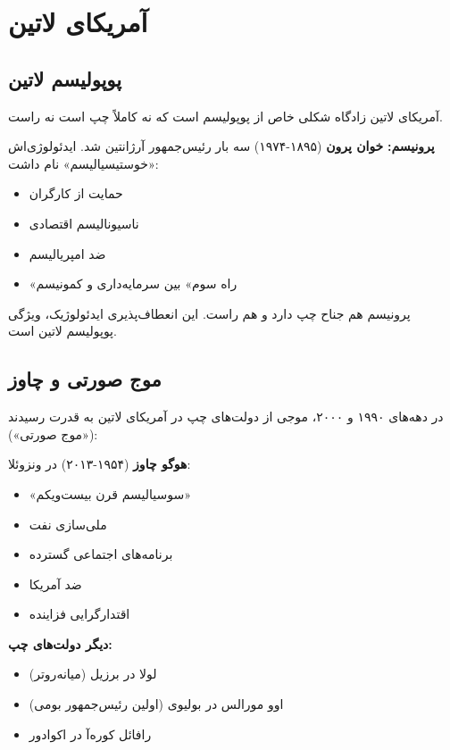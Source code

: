 \section{آمریکای لاتین}

\subsection{پوپولیسم لاتین}


آمریکای لاتین زادگاه شکلی خاص از پوپولیسم است که نه کاملاً چپ است نه راست.

\textbf{پرونیسم:}
\textbf{خوان پرون} (۱۸۹۵-۱۹۷۴) سه بار رئیس‌جمهور آرژانتین شد. ایدئولوژی‌اش «خوستیسیالیسم» نام داشت:
\begin{itemize}
    \item حمایت از کارگران
    \item ناسیونالیسم اقتصادی
    \item ضد امپریالیسم
    \item «راه سوم» بین سرمایه‌داری و کمونیسم
\end{itemize}

پرونیسم هم جناح چپ دارد و هم راست. این انعطاف‌پذیری ایدئولوژیک، ویژگی پوپولیسم لاتین است.


\subsection{موج صورتی و چاوز}


در دهه‌های ۱۹۹۰ و ۲۰۰۰، موجی از دولت‌های چپ در آمریکای لاتین به قدرت رسیدند («موج صورتی»):

\textbf{هوگو چاوز} (۱۹۵۴-۲۰۱۳) در ونزوئلا:
\begin{itemize}
    \item «سوسیالیسم قرن بیست‌ویکم»
    \item ملی‌سازی نفت
    \item برنامه‌های اجتماعی گسترده
    \item ضد آمریکا
    \item اقتدارگرایی فزاینده
\end{itemize}

\textbf{دیگر دولت‌های چپ:}
\begin{itemize}
    \item لولا در برزیل (میانه‌روتر)
    \item اوو مورالس در بولیوی (اولین رئیس‌جمهور بومی)
    \item رافائل کوره‌آ در اکوادور
\end{itemize}

